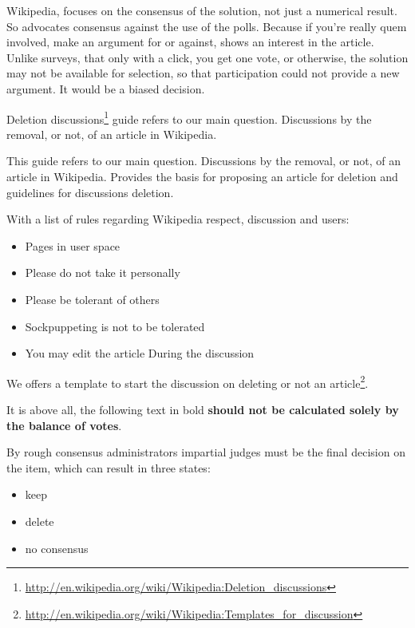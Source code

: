 \documentclass[11pt]{scrartcl}
\begin{document}
\par Wikipedia, focuses on the consensus of the solution, not just a numerical result. So advocates consensus against the use of the polls. Because if you're really quem involved, make an argument for or against, shows an interest in the article. Unlike surveys, that only with a click, you get one vote, or otherwise, the solution may not be available for selection, so that participation could not provide a new argument. It would be a biased decision.

\par Deletion discussions\footnote{\url{http://en.wikipedia.org/wiki/Wikipedia:Deletion_discussions}} guide refers to our main question. Discussions by the removal, or not, of an article in Wikipedia.

\par This guide refers to our main question. Discussions by the removal, or not, of an article in Wikipedia. Provides the basis for proposing an article for deletion and guidelines for discussions deletion.

\par With a list of rules regarding Wikipedia respect, discussion and users:

\begin{itemize}
	\item Pages in user space
	\item Please do not take it personally
	\item Please be tolerant of others
	\item Sockpuppeting is not to be tolerated
	\item You may edit the article During the discussion
\end{itemize}

\par We offers a template to start the discussion on deleting or not an article\footnote{\url{http://en.wikipedia.org/wiki/Wikipedia:Templates_for_discussion}}.

\par It is above all, the following text in bold \textbf{should not be calculated solely by the balance of votes}.

\par By rough consensus administrators impartial judges must be the final decision on the item, which can result in three states:

\begin{itemize}
	\item keep
	\item delete
	\item no consensus
\end{itemize}
\end{document}
